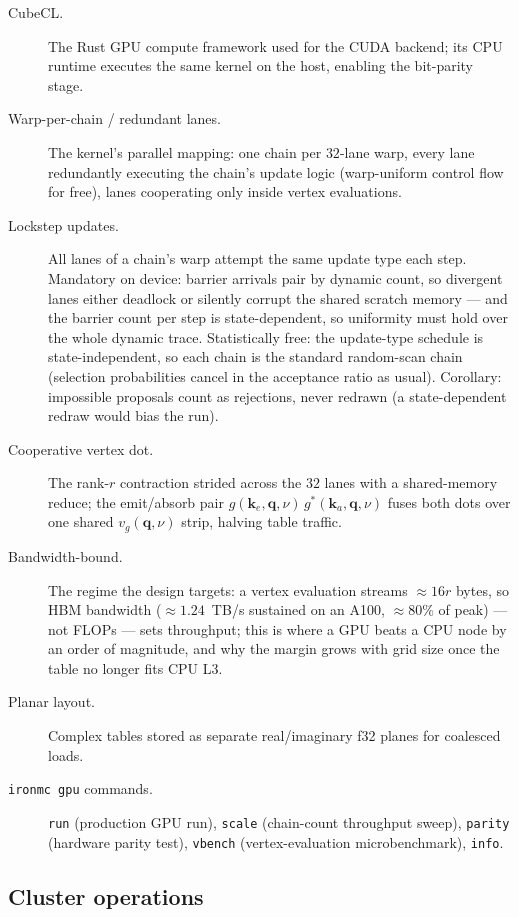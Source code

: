 \documentclass[11pt]{article}
\newcommand{\kv}{\mathbf{k}}
\newcommand{\qv}{\mathbf{q}}
\newcommand{\term}[1]{\item[#1.]}
\begin{document}
\begin{description}
\term{CubeCL} The Rust GPU compute framework used for the CUDA backend; its CPU
  runtime executes the same kernel on the host, enabling the bit-parity stage.

\term{Warp-per-chain / redundant lanes} The kernel's parallel mapping: one chain per
  $32$-lane warp, every lane redundantly executing the chain's update logic
  (warp-uniform control flow for free), lanes cooperating only inside vertex
  evaluations.

\term{Lockstep updates} All lanes of a chain's warp attempt the same update type
  each step. Mandatory on device: barrier arrivals pair by dynamic count, so divergent
  lanes either deadlock or silently corrupt the shared scratch memory --- and the
  barrier count per step is state-dependent, so uniformity must hold over the whole
  dynamic trace. Statistically free: the update-type schedule is state-independent, so
  each chain is the standard random-scan chain (selection probabilities cancel in the
  acceptance ratio as usual). Corollary: impossible proposals count as rejections,
  never redrawn (a state-dependent redraw would bias the run).

\term{Cooperative vertex dot} The rank-$r$ contraction strided across the $32$ lanes
  with a shared-memory reduce; the emit/absorb pair
  $g(\kv_{e},\qv,\nu)\,g^{*}(\kv_{a},\qv,\nu)$ fuses both dots over one shared
  $v_{g}(\qv,\nu)$ strip, halving table traffic.

\term{Bandwidth-bound} The regime the design targets: a vertex evaluation streams
  $\approx16r$ bytes, so HBM bandwidth ($\approx1.24$~TB/s sustained on an A100,
  $\approx80\%$ of peak) --- not FLOPs --- sets throughput; this is where a GPU beats a
  CPU node by an order of magnitude, and why the margin grows with grid size once the
  table no longer fits CPU L3.

\term{Planar layout} Complex tables stored as separate real/imaginary f32 planes for
  coalesced loads.

\term{\texttt{ironmc gpu} commands} \texttt{run} (production GPU run),
  \texttt{scale} (chain-count throughput sweep), \texttt{parity} (hardware parity
  test), \texttt{vbench} (vertex-evaluation microbenchmark), \texttt{info}.
\end{description}

\subsection{Cluster operations}
\end{document}
